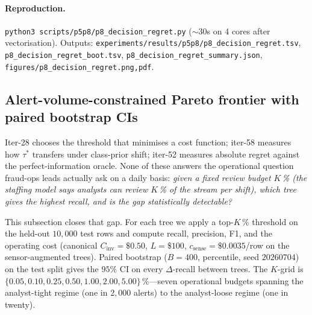 \paragraph{Reproduction.}
\texttt{python3 scripts/p5p8/p8\_decision\_regret.py} ($\sim$30s on 4 cores
after vectorisation). Outputs:
\texttt{experiments/results/p5p8/p8\_decision\_regret.tsv},
\texttt{p8\_decision\_regret\_boot.tsv},
\texttt{p8\_decision\_regret\_summary.json},
\texttt{figures/p8\_decision\_regret.{png,pdf}}.

\subsection{Alert-volume-constrained Pareto frontier with paired bootstrap CIs}
\label{sec:p8-alert-volume}

Iter-28 chooses the threshold that minimises a cost function; iter-58
measures how $\tau^{*}$ transfers under class-prior shift; iter-52 measures
absolute regret against the perfect-information oracle. None of these
answers the operational question fraud-ops leads actually ask on a daily
basis: \emph{given a fixed review budget $K$\,\% (the staffing model says
analysts can review $K$\,\% of the stream per shift), which tree gives
the highest recall, and is the gap statistically detectable?}

This subsection closes that gap. For each tree we apply a top-$K$\,\%
threshold on the held-out $10{,}000$ test rows and compute recall,
precision, F1, and the operating cost (canonical
$C_{\text{inv}}{=}\$0.50$, $L{=}\$100$, $c_{\text{sense}}{=}\$0.0035$/row
on the sensor-augmented trees). Paired bootstrap ($B{=}400$, percentile,
seed $20260704$) on the test split gives the $95\%$ CI on every
$\Delta$-recall between trees. The $K$-grid is
$\{0.05, 0.10, 0.25, 0.50, 1.00, 2.00, 5.00\}\,\%$---seven operational
budgets spanning the analyst-tight regime (one in $2{,}000$ alerts) to the
analyst-loose regime (one in twenty).

